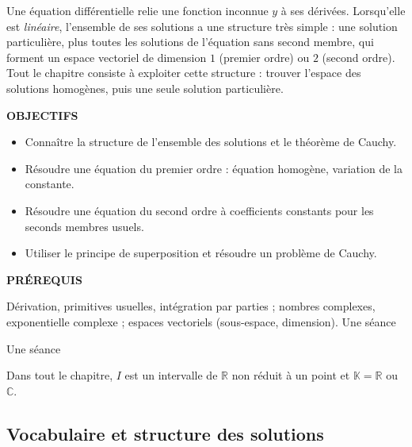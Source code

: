 \documentclass[a4paper,11pt]{article}
\numberwithin{equation}{section}
\numberwithin{figure}{section}
\numberwithin{table}{section}
\theoremstyle{enonce}
\theoremstyle{exemple}
\theoremstyle{remarque}
\newcommand{\ouverture}[3]{%
  \begin{tcolorbox}[enhanced,colback=Fond,colframe=Fond,arc=0pt,boxrule=0pt,left=12pt,right=12pt,top=10pt,bottom=10pt,
     before skip=1.2em,after skip=1.6em]
  \begin{minipage}[t]{0.56\linewidth}
  {\sffamily\bfseries\small\color{Bleu}OBJECTIFS}\par\vspace{0.3em}\small #1
  \end{minipage}\hfill
  \begin{minipage}[t]{0.38\linewidth}
  {\sffamily\bfseries\small\color{Bleu}PRÉREQUIS}\par\vspace{0.3em}\small #2
  \ifx\relax#3\relax\else\par\vspace{0.6em}{\sffamily\bfseries\small\color{Bleu}DURÉE}\par\vspace{0.2em}\small #3\fi
  \end{minipage}
  \end{tcolorbox}}
\newcommand{\K}{\mathbb{K}}
\newcommand{\R}{\mathbb{R}}
\newcommand{\C}{\mathbb{C}}
\newif\ifPT \ifdefined\VERSIONPT \PTtrue \else \PTfalse \fi
\begin{document}
Une équation différentielle relie une fonction inconnue $y$ à ses dérivées. Lorsqu'elle est \emph{linéaire}, l'ensemble de
ses solutions a une structure très simple : une solution particulière, plus toutes les solutions de l'équation sans second
membre, qui forment un espace vectoriel de dimension $1$ (premier ordre) ou $2$ (second ordre). Tout le chapitre consiste à
exploiter cette structure : trouver l'espace des solutions homogènes, puis une seule solution particulière.

\ifPT
\ouverture{%
\begin{itemize}[leftmargin=1.1em,itemsep=1pt]
\item Connaître la structure de l'ensemble des solutions et le théorème de Cauchy linéaire.
\item Résoudre les équations du premier ordre et du second ordre à coefficients constants.
\item Résoudre une équation du second ordre à coefficients continus en suivant une méthode indiquée.
\item Recoller des solutions en un point où le coefficient dominant s'annule.
\end{itemize}}{%
Dérivation, primitives usuelles, intégration par parties ; nombres complexes, exponentielle complexe ; espaces vectoriels
(sous-espace, dimension) ; pour le §1.4, séries entières.}{Deux séances}
\else
\ouverture{%
\begin{itemize}[leftmargin=1.1em,itemsep=1pt]
\item Connaître la structure de l'ensemble des solutions et le théorème de Cauchy.
\item Résoudre une équation du premier ordre : équation homogène, variation de la constante.
\item Résoudre une équation du second ordre à coefficients constants pour les seconds membres usuels.
\item Utiliser le principe de superposition et résoudre un problème de Cauchy.
\end{itemize}}{%
Dérivation, primitives usuelles, intégration par parties ; nombres complexes, exponentielle complexe ; espaces vectoriels
(sous-espace, dimension).}{Une séance}
\fi

Dans tout le chapitre, $I$ est un intervalle de $\R$ non réduit à un point et $\K=\R$ ou $\C$.

\subsection{Vocabulaire et structure des solutions}\label{ss:structure}
\end{document}
